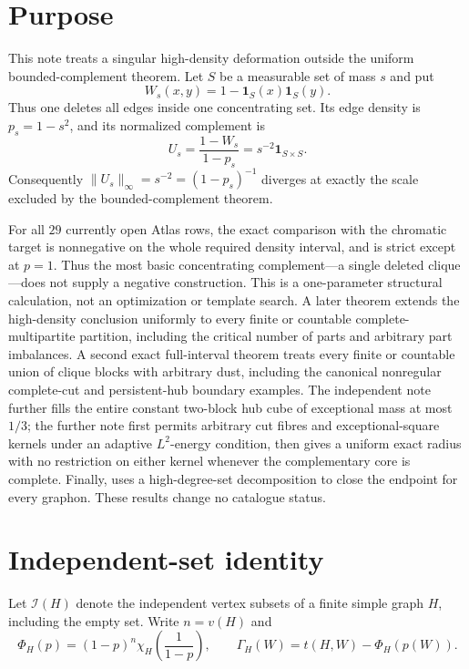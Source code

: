 \documentclass[11pt]{article}
\newcommand{\Gap}{\Gamma_H}
\begin{document}
\section{Purpose}

This note treats a singular high-density deformation outside the uniform
bounded-complement theorem.  Let $S$ be a measurable
set of mass $s$ and put
\[
 W_s(x,y)=1-\mathbf 1_S(x)\mathbf 1_S(y).
 \tag{1.1}\label{eq:hole}
\]
Thus one deletes all edges inside one concentrating set.  Its edge density is
$p_s=1-s^2$, and its normalized complement is
\[
 U_s=\frac{1-W_s}{1-p_s}=s^{-2}\mathbf 1_{S\times S}.
\]
Consequently $\lVert U_s\rVert_\infty=s^{-2}=(1-p_s)^{-1}$ diverges at
exactly the scale excluded by the bounded-complement theorem.

For all $29$ currently open Atlas rows, the exact comparison with the
chromatic target is nonnegative on the whole required density interval, and
is strict except at $p=1$.  Thus the most basic concentrating complement---a
single deleted clique---does not supply a negative construction.  This is a
one-parameter structural calculation, not an optimization or template
search.  A later theorem extends the high-density conclusion uniformly to
every finite or countable complete-multipartite partition, including the
critical number of parts and arbitrary part imbalances.  A second exact
 full-interval theorem treats every finite or countable union of clique
 blocks with arbitrary dust, including the canonical nonregular complete-cut
 and persistent-hub boundary examples.  The independent note
  further fills the
 entire constant two-block hub cube of exceptional mass at most $1/3$; the
 further note
  first permits
 arbitrary cut fibres and exceptional-square kernels under an adaptive
 $L^2$-energy condition, then gives a uniform exact radius with no restriction
 on either kernel whenever the complementary core is complete.  Finally,
  uses a
 high-degree-set decomposition to close the endpoint for every graphon.
These results change no catalogue status.

\section{Independent-set identity}

Let $\mathcal I(H)$ denote the independent vertex subsets of a finite simple
graph $H$, including the empty set.  Write $n=v(H)$ and
\[
 \Phi_H(p)=(1-p)^n\chi_H\!\left(\frac1{1-p}\right),
 \qquad
 \Gap(W)=t(H,W)-\Phi_H(p(W)).
\]
\end{document}
